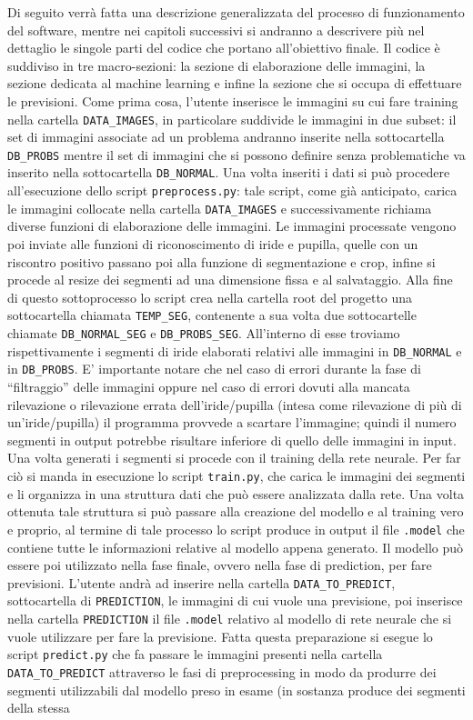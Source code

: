 Di seguito verrà fatta una descrizione generalizzata del processo di funzionamento del software, mentre nei capitoli successivi si andranno a descrivere più nel dettaglio le singole parti del codice che portano all’obiettivo finale. Il codice è suddiviso in tre macro-sezioni: la sezione di elaborazione delle immagini, la sezione dedicata al machine learning e infine la sezione che si occupa di effettuare le previsioni. Come prima cosa, l’utente inserisce le immagini su cui fare training nella cartella \texttt{DATA\_IMAGES}, in particolare suddivide le immagini in due subset: il set di immagini associate ad un problema andranno inserite nella sottocartella \texttt{DB\_PROBS} mentre il set di immagini che si possono definire senza problematiche va inserito nella sottocartella \texttt{DB\_NORMAL}. Una volta inseriti i dati si può procedere all’esecuzione dello script \texttt{preprocess.py}: tale script, come già anticipato, carica le immagini collocate nella cartella \texttt{DATA\_IMAGES} e successivamente richiama diverse funzioni di elaborazione delle immagini. Le immagini processate vengono poi inviate alle funzioni di riconoscimento di iride e pupilla, quelle con un riscontro positivo passano poi alla funzione di segmentazione e crop, infine si procede al resize dei segmenti ad una dimensione fissa e al salvataggio. Alla fine di questo sottoprocesso lo script crea nella cartella root del progetto una sottocartella chiamata \texttt{TEMP\_SEG}, contenente a sua volta due sottocartelle chiamate \texttt{DB\_NORMAL\_SEG} e \texttt{DB\_PROBS\_SEG}. All’interno di esse troviamo rispettivamente i segmenti di iride elaborati relativi  alle immagini in \texttt{DB\_NORMAL} e in \texttt{DB\_PROBS}. E’ importante notare che nel caso di errori durante la fase di “filtraggio” delle immagini oppure nel caso di errori dovuti alla mancata rilevazione o rilevazione errata dell’iride/pupilla (intesa come rilevazione di più di un’iride/pupilla)  il programma provvede a scartare l’immagine; quindi il numero segmenti in output potrebbe risultare inferiore di quello delle immagini in input. Una volta generati i segmenti si procede con il training della rete neurale. Per far ciò si manda in esecuzione lo script \texttt{train.py}, che carica le immagini dei segmenti e li organizza in una struttura dati che può essere analizzata dalla rete. Una volta ottenuta tale struttura si può passare alla creazione del modello e al training vero e proprio, al termine di tale processo lo script produce in output il file \texttt{.model} che contiene tutte le informazioni relative al modello appena generato. Il modello può essere poi utilizzato nella fase finale, ovvero nella fase di prediction, per fare previsioni. L’utente andrà ad inserire nella cartella \texttt{DATA\_TO\_PREDICT}, sottocartella di \texttt{PREDICTION}, le immagini di cui vuole una previsione, poi inserisce nella cartella \texttt{PREDICTION} il file \texttt{.model} relativo al modello di rete neurale che si vuole utilizzare per fare la previsione. Fatta questa preparazione si esegue lo script \texttt{predict.py} che fa passare le immagini presenti nella cartella \texttt{DATA\_TO\_PREDICT} attraverso le fasi di preprocessing in modo da produrre dei segmenti utilizzabili dal modello preso in esame (in sostanza produce dei segmenti della stessa 